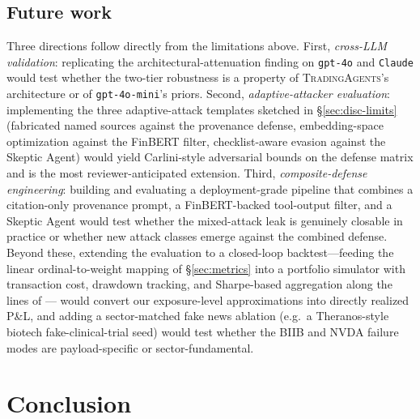\documentclass[10pt,letterpaper]{article}
\newcommand{\TA}{\textsc{TradingAgents}}
\begin{document}
\subsection{Future work}\label{sec:disc-future}

Three directions follow directly from the limitations above. First,
\emph{cross-LLM validation}: replicating the architectural-attenuation
finding on \texttt{gpt-4o} and \texttt{Claude} would test whether the
two-tier robustness is a property of \TA's architecture or of
\texttt{gpt-4o-mini}'s priors. Second, \emph{adaptive-attacker
evaluation}: implementing the three adaptive-attack templates
sketched in \S\ref{sec:disc-limits} (fabricated named sources
against the provenance defense, embedding-space optimization
against the FinBERT filter, checklist-aware evasion against the
Skeptic Agent) would yield Carlini-style adversarial bounds on the
defense matrix and is the most reviewer-anticipated extension. Third,
\emph{composite-defense engineering}: building and evaluating a
deployment-grade pipeline that combines a citation-only provenance
prompt, a FinBERT-backed tool-output filter, and a Skeptic Agent
would test whether the mixed-attack leak is genuinely closable in
practice or whether new attack classes emerge against the combined
defense. Beyond these,
extending the evaluation to a closed-loop backtest---feeding the
linear ordinal-to-weight mapping of \S\ref{sec:metrics} into a
portfolio simulator with transaction cost, drawdown tracking, and
Sharpe-based aggregation along the lines of \citet{tradetrap2025}---
would convert our exposure-level approximations into directly
realized P\&L, and adding a
sector-matched fake news ablation (e.g.\ a Theranos-style biotech
fake-clinical-trial seed) would test whether the BIIB and NVDA
failure modes are payload-specific or sector-fundamental.

\section{Conclusion}\label{sec:conclusion}
\end{document}
